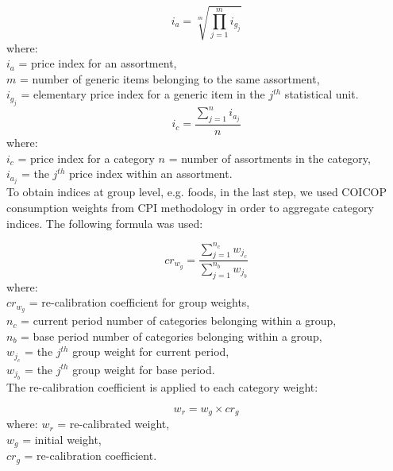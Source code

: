 \documentclass[]{article}
\begin{document}
\begin{equation}\label{eq:4}
i_{a} = \sqrt[m]{\prod_{j=1}^m i_{g_{j}}}
\end{equation}
where:\\
$i_{a}$ = price index for an assortment, \\
$m$ = number of generic items belonging to the same assortment, \\
$i_{g_{j}}$ = elementary price index for a generic item in the $j^{th}$ statistical unit.\\


\begin{equation}\label{eq:5}
i_{c} = \frac{\sum_{j=1}^n i_{a_{j}}}{n}
\end{equation}
where:\\
$i_{c}$ = price index for a category
$n$ = number of assortments in the category, \\
$i_{a_{j}}$ = the $j^{th}$ price index within an assortment.\\


To obtain indices at group level, e.g. foods, in the last step, we used COICOP consumption weights from CPI methodology in order to aggregate category indices.  The following formula was used:


\begin{equation}\label{eq:6}
cr_{w_{g}} = \frac{\sum_{j=1}^{n_{c}}{w_{j_{c}}}}{\sum_{j=1}^{n_{b}}{w_{j_{b}}}}
\end{equation}
where:\\
$cr_{w_{g}}$ = re-calibration coefficient for group weights, \\
$n_{c}$ = current period number of categories belonging within a group, \\
$n_{b}$ = base period number of categories belonging within a group, \\
$w_{j_{c}}$ = the $j^{th}$ group weight for current period, \\
$w_{j_{b}}$ = the $j^{th}$ group weight for base period.\\

The re-calibration coefficient is applied to each category weight:

\begin{equation}\label{eq:7}
  w_{r} = w_{g} \times cr_{g}
\end{equation}
where:
$w_{r}$ = re-calibrated weight, \\
$w_{g}$ = initial weight, \\
$cr_{g}$ = re-calibration coefficient.\\
\end{document}
